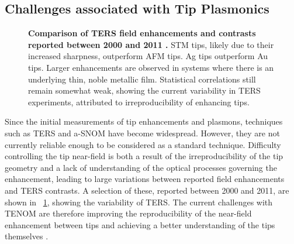\documentclass{article}
\begin{document}
\subsection{Challenges associated with Tip Plasmonics}

\begin{figure}
\centering
{}
{\caption[Comparison of TERS field enhancements and contrasts reported between 2000 and 2011 \cite{pettinger2012}]{\textbf{Comparison of TERS field enhancements and contrasts reported between 2000 and 2011 \cite{pettinger2012}.} STM tips, likely due to their increased sharpness, outperform AFM tips. Ag tips outperform Au tips. Larger enhancements are observed in systems where there is an underlying thin, noble metallic film. Statistical correlations still remain somewhat weak, showing the current variability in TERS experiments, attributed to irreproducibility of enhancing tips.}
\label{fig:pettinger2012}}
\end{figure}

Since the initial measurements of tip enhancements and plasmons, techniques such as TERS and a-SNOM have become widespread. However, they are not currently reliable enough to be considered as a standard technique. Difficulty controlling the tip near-field is both a result of the irreproducibility of the tip geometry and a lack of understanding of the optical processes governing the enhancement, leading to large variations between reported field enhancements and TERS contrasts. A selection of these, reported between 2000 and 2011, are shown in \figurename~\ref{fig:pettinger2012}, showing the variability of TERS. The current challenges with TENOM are therefore improving the reproducibility of the near-field enhancement between tips \cite{blum2014, kumar2014, mino2014} and achieving a better understanding of the tips themselves \cite{zhang2009}.
\end{document}
